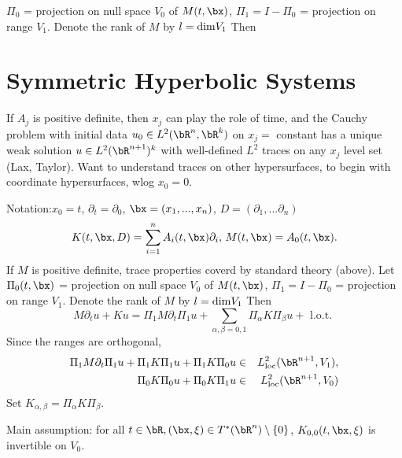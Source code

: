 $\Pi_0$ = projection on null space $V_0$ of $M(t,\bx)$, $\Pi_1=I-\Pi_0$ = projection on range $V_1$. Denote the rank of $M$ by $l={\rm dim} V_1$ Then

\section{Symmetric Hyperbolic Systems}

If $A_j$ is positive definite, then $x_j$ can play the role of time, and the Cauchy problem with initial data $u_0 \in L^2(\bR^n,\bR^k)$  on $x_j=$ constant has a unique weak solution $u \in L^2(\bR^{n+1})^k$ with well-defined $L^2$ traces on any $x_j$ level set (Lax, Taylor). Want to understand traces on other hypersurfaces, to begin with coordinate hypersurfaces, wlog $x_0=0$.

Notation:$x_0=t$, $\partial_t=\partial_0$, $\bx = (x_1,...,x_n)$, $D=(\partial_1,...\partial_n)$
\[
  K(t,\bx,D)= \sum_{i=1}^n A_i(t,\bx)\partial_i, \, M(t,\bx) = A_0(t,\bx).
\]
If $M$ is positive definite, trace properties coverd by standard theory (above). Let $\Pi_0(t,\bx)$ = projection on null space $V_0$ of $M(t,\bx)$, $\Pi_1=I-\Pi_0$ = projection on range $V_1$. Denote the rank of $M$ by $l={\rm dim} V_1$ Then
\[
  M\partial_t u + Ku = \Pi_1 M \partial_t \Pi_1 u + \sum_{\alpha,\beta=0,1} \Pi_{\alpha}K\Pi_{\beta}u + \mbox{ l.o.t. }
\]
Since the ranges are orthogonal,
\begin{eqnarray}
  \Pi_1 M \partial_t \Pi_1 u + \Pi_1 K \Pi_1 u + \Pi_1 K \Pi_0 u & \in & L^2_{\rm loc}(\bR^{n+1},V_1),
  \label{eqn:decomp1} \\
  \Pi_0 K \Pi_0 u + \Pi_0 K \Pi_1 u & \in & L^2_{\rm loc}(\bR^{n+1},V_0)
  \label{eqn:decomp0}
\end{eqnarray}
Set $K_{\alpha,\beta} = \Pi_{\alpha}K\Pi_{\beta}$.

Main assumption: for all $t \in \bR, (\bx,\xi) \in T^*(\bR^n)\setminus \{0\}$, $K_{0,0}(t,\bx,\xi)$ is invertible on $V_0$.


